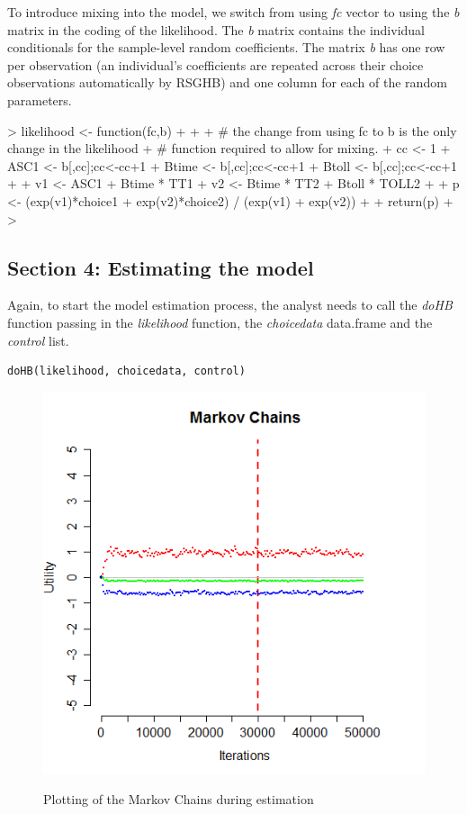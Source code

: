 \documentclass{article}
\begin{document}
To introduce mixing into the model, we switch from using \emph{fc} vector to using the \emph{b} matrix in the coding of the likelihood. The \emph{b} matrix contains the individual conditionals for the sample-level random coefficients. The matrix \emph{b} has one row per observation (an individual's coefficients are repeated across their choice observations automatically by RSGHB) and one column for each of the random parameters.

\begin{Schunk}
\begin{Sinput}
> likelihood <- function(fc,b)
+ {  
+      
+      # the change from using fc to b is the only change in the likelihood 
+      # function required to allow for mixing.
+      cc     <- 1
+      ASC1   <- b[,cc];cc<-cc+1
+      Btime  <- b[,cc];cc<-cc+1
+      Btoll  <- b[,cc];cc<-cc+1  
+   
+      v1 <- ASC1       + Btime * TT1                   
+      v2 <-              Btime * TT2 + Btoll * TOLL2   
+  
+      p  <- (exp(v1)*choice1 + exp(v2)*choice2) / (exp(v1) + exp(v2))
+      
+      return(p)
+ }
> 
\end{Sinput}
\end{Schunk}

\subsection*{Section 4: Estimating the model}

Again, to start the model estimation process, the analyst needs to call the \emph{doHB} function passing in the \emph{likelihood} function, the \emph{choicedata} data.frame and the \emph{control} list. 

\begin{verbatim}
doHB(likelihood, choicedata, control)
\end{verbatim}

\begin{figure}
\caption{Plotting of the Markov Chains during estimation}
\includegraphics[scale=0.50]{MNL_markovChains2.png}
\label{MarkovChain2}
\end{figure}
\end{document}
